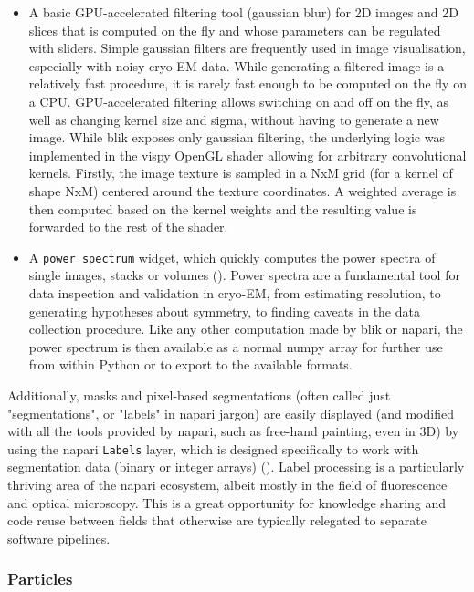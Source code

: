 \begin{itemize} 
    \item A basic GPU-accelerated filtering tool (gaussian blur) for 2D images and 2D slices that is computed on the fly and whose parameters can be regulated with sliders. Simple gaussian filters are frequently used in image visualisation, especially with noisy cryo-EM data. While generating a filtered image is a relatively fast procedure, it is rarely fast enough to be computed on the fly on a CPU. GPU-accelerated filtering allows switching on and off on the fly, as well as changing kernel size and sigma, without having to generate a new image. While blik exposes only gaussian filtering, the underlying logic was implemented in the vispy OpenGL shader allowing for arbitrary convolutional kernels. Firstly, the image texture is sampled in a NxM grid (for a kernel of shape NxM) centered around the texture coordinates. A weighted average is then computed based on the kernel weights and the resulting value is forwarded to the rest of the shader. 
    \item A \texttt{power\ spectrum} widget, which quickly computes the power spectra of single images, stacks or volumes (). Power spectra are a fundamental tool for data inspection and validation in cryo-EM, from estimating resolution, to generating hypotheses about symmetry, to finding caveats in the data collection procedure. Like any other computation made by blik or napari, the power spectrum is then available as a normal numpy array for further use from within Python or to export to the available formats.
\end{itemize}

Additionally, masks and pixel-based segmentations (often called just "segmentations", or "labels" in napari jargon) are easily displayed (and modified with all the tools provided by napari, such as free-hand painting, even in 3D) by using the napari \texttt{Labels} layer, which is designed specifically to work with segmentation data (binary or integer arrays) (). Label processing is a particularly thriving area of the napari ecosystem, albeit mostly in the field of fluorescence and optical microscopy. This is a great opportunity for knowledge sharing and code reuse between fields that otherwise are typically relegated to separate software pipelines.

\subsubsection{Particles}\label{particles}

